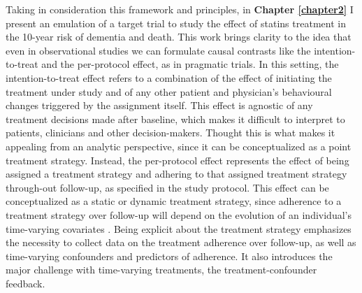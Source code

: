 \documentclass[
]{book}
\begin{document}
Taking in consideration this framework and principles, in \textbf{Chapter \ref{chapter2}} I present an emulation of a target trial to study the effect of statins treatment in the 10-year risk of dementia and death. This work brings clarity to the idea that even in observational studies we can formulate causal contrasts like the intention-to-treat and the per-protocol effect, as in pragmatic trials. In this setting, the intention-to-treat effect refers to a combination of the effect of initiating the treatment under study and of any other patient and physician's behavioural changes triggered by the assignment itself. This effect is agnostic of any treatment decisions made after baseline, which makes it difficult to interpret to patients, clinicians and other decision-makers\autocite{murray2019,murray2018}. Thought this is what makes it appealing from an analytic perspective, since it can be conceptualized as a point treatment strategy. Instead, the per-protocol effect represents the effect of being assigned a treatment strategy and adhering to that assigned treatment strategy through-out follow-up, as specified in the study protocol. This effect can be conceptualized as a static or dynamic treatment strategy, since adherence to a treatment strategy over follow-up will depend on the evolution of an individual's time-varying covariates \autocite{whatif2020}. Being explicit about the treatment strategy emphasizes the necessity to collect data on the treatment adherence over follow-up, as well as time-varying confounders and predictors of adherence. It also introduces the major challenge with time-varying treatments, the treatment-confounder feedback.
\end{document}
